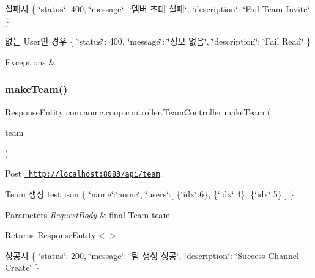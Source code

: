 실패시 \{ \char`\"{}status\char`\"{}\+: 400, \char`\"{}message\char`\"{}\+: \char`\"{}멤버 초대 실패\char`\"{}, \char`\"{}description\char`\"{}\+: \char`\"{}\+Fail Team Invite\char`\"{} \}

없는 User인 경우 \{ \char`\"{}status\char`\"{}\+: 400, \char`\"{}message\char`\"{}\+: \char`\"{}정보 없음\char`\"{}, \char`\"{}description\char`\"{}\+: \char`\"{}\+Fail Read\char`\"{} \}


\begin{DoxyExceptions}{Exceptions}
{\em } & \\
\hline
\end{DoxyExceptions}
\mbox{\label{classcom_1_1aomc_1_1coop_1_1controller_1_1_team_controller_a5ffe7bc4c7dd609d828848bae014440f}} 
\subsubsection{\texorpdfstring{makeTeam()}{makeTeam()}}
{\footnotesize\ttfamily Response\+Entity com.\+aomc.\+coop.\+controller.\+Team\+Controller.\+make\+Team (\begin{DoxyParamCaption}\item[{@Request\+Body final Team}]{team }\end{DoxyParamCaption})}



Post \href{http://localhost:8083/api/team}{\texttt{ http\+://localhost\+:8083/api/team}}. 

Team 생성 test json \{ \char`\"{}name\char`\"{}\+:\char`\"{}aomc\char`\"{}, \char`\"{}users\char`\"{}\+:\mbox{[} \{\char`\"{}idx\char`\"{}\+:6\}, \{\char`\"{}idx\char`\"{}\+:4\}, \{\char`\"{}idx\char`\"{}\+:5\} \mbox{]} \}


\begin{DoxyParams}{Parameters}
{\em Request\+Body} & final Team team\\
\hline
\end{DoxyParams}
\begin{DoxyReturn}{Returns}
Response\+Entity$<$$>$
\end{DoxyReturn}
성공시 \{ \char`\"{}status\char`\"{}\+: 200, \char`\"{}message\char`\"{}\+: \char`\"{}팀 생성 성공\char`\"{}, \char`\"{}description\char`\"{}\+: \char`\"{}\+Success Channel Create\char`\"{} \}

